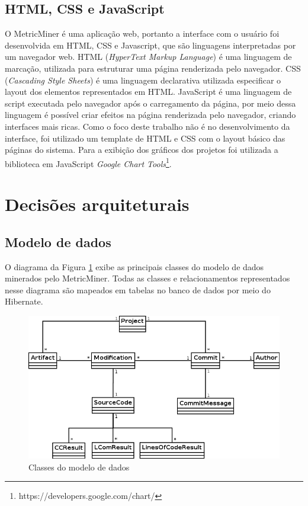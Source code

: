 \documentclass[a4paper, 12pt, twoside]{book}
\begin{document}
        \subsection*{HTML, CSS e JavaScript}
            O MetricMiner é uma aplicação web, portanto a interface com o usuário foi desenvolvida em HTML, CSS e Javascript, que são linguagens interpretadas por um navegador web. HTML (\textit{HyperText Markup Language}) é uma linguagem de marcação, utilizada para estruturar uma página renderizada pelo navegador. CSS (\textit{Cascading Style Sheets}) é uma linguagem declarativa utilizada especificar o layout dos elementos representados em HTML. JavaScript é uma linguagem de script executada pelo navegador após o carregamento da página, por meio dessa linguagem é possível criar efeitos na página renderizada pelo navegador, criando interfaces mais ricas. Como o foco deste trabalho não é no desenvolvimento da interface, foi utilizado um template de HTML e CSS com o layout básico das páginas do sistema. Para a exibição dos gráficos dos projetos foi utilizada a biblioteca em JavaScript \textit{Google Chart Tools}\footnote{https://developers.google.com/chart/}.

    \section{Decisões arquiteturais} \label{sc:arquitetura}

        \subsection*{Modelo de dados}
            O diagrama da Figura \ref{fig:uml_modelo} exibe as principais classes do modelo de dados minerados pelo MetricMiner. Todas as classes e relacionamentos representados nesse diagrama são mapeados em tabelas no banco de dados por meio do Hibernate. 

                \begin{figure}[ht]
                    \centering
                    \includegraphics[width=1.00\textwidth]{img/uml-modelo.png}
                    \caption{Classes do modelo de dados}
                    \label{fig:uml_modelo}
                \end{figure}
\end{document}
